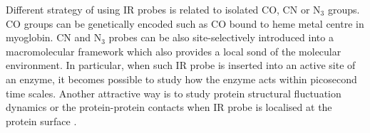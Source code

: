 \documentclass[b5paper,oneside,fleqn,11pt]{book}
\begin{document}
\begin{refsection}
Different strategy of using IR probes is related to isolated CO, CN or N$_3$ groups.
CO groups can be genetically encoded
such as CO bound to heme metal centre in myoglobin. 
CN and N$_3$ probes can be also site-selectively introduced into a macromolecular 
framework \citep{Jo.Culik.Korendovych.DeGrado.Gai.Biochem.2010,
Wang.Winblade.Johnson.Tirrell.Grabstein.ChemBioChem.2008,Fafarman.Webb.Chuang.Boxer.JACS.2006,
Kiick.Saxon.Tirrell.Bertozzi.PNAS.2002} 
which also provides
a local sond of the molecular environment. In particular, when such IR probe
is inserted into an active site of an enzyme, it becomes possible to study
how the enzyme acts within picosecond time scales. \citep{Fried.Bagchi.Boxer.Science.2014,Bagchi.Boxer.Fayer.JPCB.2012,
Ye.Zaitseva.Caltabiano.Schertler.Sakmar.Deupi.Vogel.Nature.2010} 
Another attractive way is to study protein structural fluctuation dynamics
or the protein-protein contacts when IR probe is localised at the protein 
surface \citep{Taskent-Sezgin.Chung.Banerjee.Nagarajan.Dyer.Carrico.Raleigh.AngewChemInt.2010,
Stafford.Ensign.Webb.JPCB.2010,Oh.Lee.Joo.Han.Cho.JPCB.2008}.  


\end{refsection}
\end{document}
